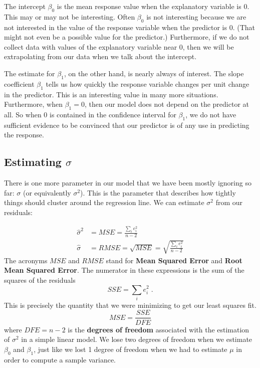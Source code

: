 \documentclass[twoside]{book}
\def\term#1{\textbf{#1}}
\begin{document}
The intercept $\beta_0$ is the mean response value when the 
explanatory variable is 0.  This may or may not be interesting.
Often $\beta_0$ is not interesting because we are not interested
in the value of the response variable when the predictor is 0.  (That might not 
even be a possible value for the predictor.)  Furthermore, 
if we do not collect data with values of the explanatory variable near 0, then
we will be extrapolating from our data when we talk about the intercept.

The estimate for $\beta_1$, on the other hand, is nearly always of interest.
The slope coefficient $\beta_1$ tells us how quickly the response variable changes 
per unit change in the predictor.  This is an interesting value in many more situations.
Furthermore, when $\beta_1 = 0$, then our model does not depend on the predictor at all.
So when 0 is contained in the confidence interval for $\beta_1$, we do not have sufficient 
evidence to be convinced that our predictor is of any use in predicting the response.

\subsection{Estimating $\sigma$}

There is one more parameter in our model that we have been mostly ignoring so far: $\sigma$ (or 
equivalently $\sigma^2$).  This is the parameter that describes how tightly things should 
cluster around the regression line.  We can estimate $\sigma^2$ from our residuals:

\begin{align*}
\hat\sigma^2 & = MSE = \frac{ \sum_i e_i^2 }{ n -2 }
\\
\hat\sigma & = RMSE = \sqrt{MSE} = \sqrt{\frac{ \sum_i e_i^2 }{ n -2 } }
\end{align*}
The acronyms $MSE$ and $RMSE$ stand for \term{Mean Squared Error} and 
\term{Root Mean Squared Error}.
The numerator in these expressions is the sum of the squares of the residuals
\[
SSE = \sum_i e_i^2 \;.
\]
This is precisely the quantity that we were minimizing to get our least squares fit.
\[
MSE = \frac{SSE}{DFE} 
\]
where $DFE = n-2$ is the \term{degrees of freedom} associated with the
estimation of $\sigma^2$ in a simple linear model.  We lose two degrees of
freedom when we estimate $\beta_0$ and $\beta_1$, just like we lost 1 degree of
freedom when we had to estimate $\mu$ in order to compute a sample variance.
\end{document}
